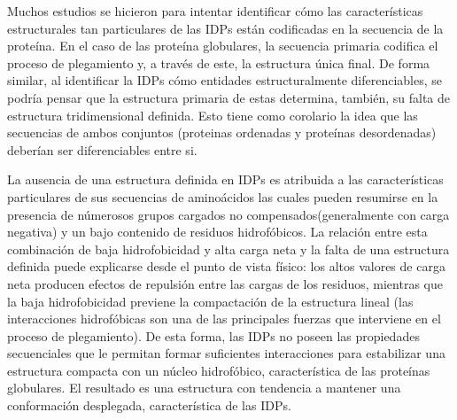 Muchos estudios se hicieron para intentar identificar cómo las características  estructurales tan particulares de las IDPs están codificadas en la secuencia de la proteína.
En el caso de las proteína globulares, la secuencia primaria codifica el proceso de plegamiento y, a través de este, la estructura única final. 
De forma similar, al identificar la IDPs cómo entidades estructuralmente diferenciables, se podría pensar que la estructura primaria de estas determina, también, su falta de estructura tridimensional definida.
Esto tiene como corolario la idea que las secuencias de ambos conjuntos (proteinas ordenadas y proteínas desordenadas) deberían ser diferenciables entre si.

La ausencia de una estructura definida en IDPs es atribuida a las características particulares de sus secuencias de aminoácidos las cuales pueden resumirse en la presencia de númerosos 
grupos cargados no compensados(generalmente con carga negativa) y un bajo contenido de residuos hidrofóbicos. 
La relación entre esta combinación de baja hidrofobicidad y alta carga neta y la falta de una estructura definida puede explicarse desde el punto de vista físico:
los altos valores de carga neta producen efectos de repulsión entre las cargas de los residuos, mientras que la baja hidrofobicidad previene la compactación de la estructura lineal
(las interacciones hidrofóbicas son una de las principales fuerzas que interviene en el proceso de plegamiento).
De esta forma, las IDPs no poseen las propiedades secuenciales que le permitan formar suficientes interacciones para estabilizar una estructura compacta con un núcleo hidrofóbico, característica de las proteínas globulares.
El resultado es una estructura con tendencia a mantener una conformación desplegada, característica de las IDPs.

 
% 


